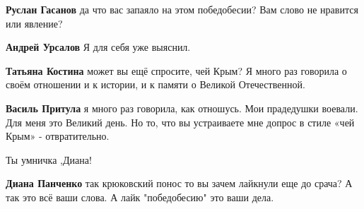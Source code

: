 \begin{itemize}
\begin{itemize}
\textbf{Руслан Гасанов} да что вас запаяло на этом победобесии? Вам слово не нравится или явление?

 
\textbf{Андрей Урсалов} Я для себя уже выяснил.


 
\textbf{Татьяна Костина} может вы ещё спросите, чей Крым? Я много раз говорила
о своём отношении и к истории, и к памяти о Великой Отечественной.


 
\textbf{Василь Притула} я много раз говорила, как отношусь. Мои прадедушки
воевали. Для меня это Великий день. Но то, что вы устраиваете мне допрос в
стиле «чей Крым» - отвратительно.

 
Ты умничка ,Диана!

 
\textbf{Диана Панченко} так крюковский понос то вы зачем лайкнули еще до срача? А так это всё ваши слова. А лайк "победобесию" это ваши дела.

 

\end{itemize}
\end{itemize}
